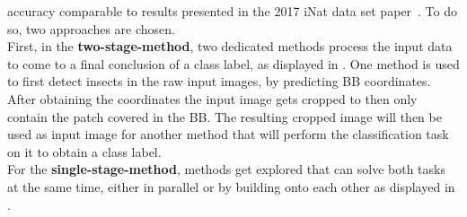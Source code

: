 accuracy comparable to results presented in the 2017 iNat data set paper~\cite{iNat}.
To do so, two approaches are chosen.\\
First, in the \textbf{two-stage-method}, two dedicated methods process the input data to come to a final conclusion of a class label, as displayed in .
One method is used to first detect insects in the raw input images, by predicting BB coordinates.
After obtaining the coordinates the input image gets cropped to then only contain the patch covered in the BB.
The resulting cropped image will then be used as input image for another method that will perform the classification task on it to obtain a class label.\\
For the \textbf{single-stage-method}, methods get explored that can solve both tasks at the same time, either in parallel or by building onto each other as displayed in .


